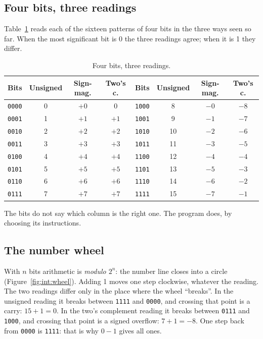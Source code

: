 \subsection{Four bits, three readings}

Table~\ref{tab:int:readings} reads each of the sixteen patterns of four bits
in the three ways seen so far. When the most significant bit is 0 the three
readings agree; when it is 1 they differ.

\begin{table}[htb]
\centering\small
\caption{Four bits, three readings.}\label{tab:int:readings}
\begin{tabular}{@{}cccc@{\qquad\qquad}cccc@{}}
\toprule
\textbf{Bits} & \textbf{Unsigned} & \textbf{Sign-mag.} & \textbf{Two's c.} &
\textbf{Bits} & \textbf{Unsigned} & \textbf{Sign-mag.} & \textbf{Two's c.}\\
\midrule
\texttt{0000} & 0 & $+0$ & 0 & \texttt{1000} & 8 & $-0$ & $-8$\\
\texttt{0001} & 1 & $+1$ & $+1$ & \texttt{1001} & 9 & $-1$ & $-7$\\
\texttt{0010} & 2 & $+2$ & $+2$ & \texttt{1010} & 10 & $-2$ & $-6$\\
\texttt{0011} & 3 & $+3$ & $+3$ & \texttt{1011} & 11 & $-3$ & $-5$\\
\texttt{0100} & 4 & $+4$ & $+4$ & \texttt{1100} & 12 & $-4$ & $-4$\\
\texttt{0101} & 5 & $+5$ & $+5$ & \texttt{1101} & 13 & $-5$ & $-3$\\
\texttt{0110} & 6 & $+6$ & $+6$ & \texttt{1110} & 14 & $-6$ & $-2$\\
\texttt{0111} & 7 & $+7$ & $+7$ & \texttt{1111} & 15 & $-7$ & $-1$\\
\bottomrule
\end{tabular}
\end{table}

\begin{prgconcept}
The bits do not say which column is the right one. The program does, by
choosing its instructions.
\end{prgconcept}

\subsection{The number wheel}

With $n$ bits arithmetic is \emph{modulo $2^{n}$}: the number line closes into
a circle (Figure~\ref{fig:int:wheel}). Adding 1 moves one step clockwise,
whatever the reading. The two readings differ only in the place where the
wheel ``breaks''. In the unsigned reading it breaks between \texttt{1111} and
\texttt{0000}, and crossing that point is a carry: $15+1=0$. In the two's
complement reading it breaks between \texttt{0111} and \texttt{1000}, and
crossing that point is a signed overflow: $7+1=-8$. One step back from
\texttt{0000} is \texttt{1111}: that is why $0-1$ gives all ones.

